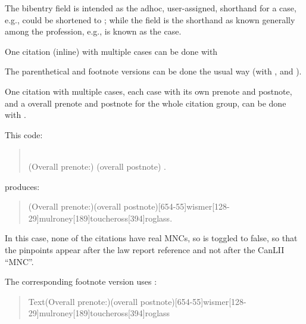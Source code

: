 \p The bibentry  field is intended as the adhoc, user-assigned, shorthand for a case, e.g.,  could be shortened to ; while the  field is the shorthand as known generally among the profession, e.g.,  is known as the  case.

\p One citation (inline) with multiple cases can be done with \\ 

The parenthetical and footnote versions can be done the usual way (with , and ).

\p One citation with multiple cases, each case with its own prenote and postnote, and a overall prenote and postnote for the whole citation group, can be done with .

This code:
\begin{magpar}
\begin{quotation}
\noindent{} \\
 (Overall prenote:) (overall postnote)        .\\
 
\end{quotation}
\end{magpar}
produces:
\begin{quotation}\noindent
\togglefalse{pinpointaftermnc}
\lawcitesinline(Overall prenote:)(overall postnote)[654-55]{wismer}[128-29]{mulroney}[189]{toucheross}[394]{roglass}.
\toggletrue{pinpointaftermnc}
\end{quotation}

In this case, none of the citations have real MNCs, so  is toggled to false, so that the pinpoints appear after the law report reference and not after the CanLII ``MNC''.

\p The corresponding footnote version uses :

\begin{quotation}
\togglefalse{pinpointaftermnc}
Text\lawcitesfoot(Overall prenote:)(overall postnote)[654-55]{wismer}[128-29]{mulroney}[189]{toucheross}[394]{roglass}
\toggletrue{pinpointaftermnc}
\end{quotation}

